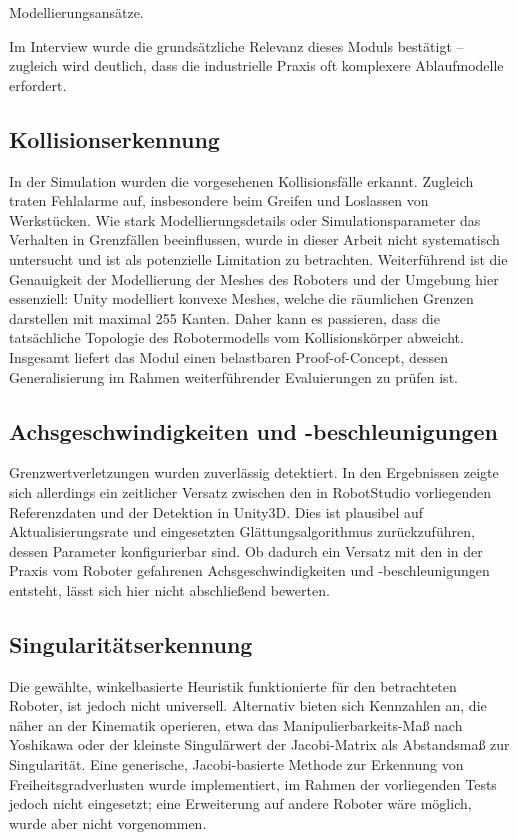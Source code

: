 Modellierungsansätze.{ Im Interview
  wurde die grundsätzliche Relevanz dieses
  Moduls bestätigt – zugleich wird deutlich, dass die industrielle Praxis oft
  komplexere Ablaufmodelle erfordert.

  \subsection{Kollisionserkennung}

  In der Simulation wurden die vorgesehenen Kollisionsfälle erkannt. Zugleich
  traten Fehlalarme auf, insbesondere beim Greifen und Loslassen von
  Werkstücken. Wie stark Modellierungsdetails oder
  Simulationsparameter das Verhalten in Grenzfällen beeinflussen,
  wurde in dieser Arbeit nicht systematisch untersucht
  und ist als potenzielle Limitation zu betrachten. Weiterführend ist die
  Genauigkeit der Modellierung der Meshes des Roboters und der Umgebung hier
  essenziell: Unity modelliert konvexe Meshes, welche die räumlichen Grenzen
  darstellen mit maximal 255 Kanten. Daher kann es passieren, dass die
  tatsächliche Topologie des Robotermodells vom Kollisionskörper abweicht.
  Insgesamt liefert das Modul einen belastbaren Proof-of-Concept, dessen
  Generalisierung im Rahmen weiterführender Evaluierungen zu prüfen ist.

  \subsection{Achsgeschwindigkeiten und -beschleunigungen}

  Grenzwertverletzungen wurden zuverlässig detektiert. In den Ergebnissen zeigte
  sich allerdings ein zeitlicher Versatz zwischen den in RobotStudio
  vorliegenden
  Referenzdaten und der Detektion in Unity3D. Dies ist plausibel auf
  Aktualisierungsrate und eingesetzten Glättungsalgorithmus
  zurückzuführen, dessen
  Parameter konfigurierbar sind. Ob dadurch ein Versatz mit den in der Praxis
  vom Roboter gefahrenen Achsgeschwindigkeiten und -beschleunigungen
  entsteht, lässt sich hier
  nicht abschließend bewerten.

  \subsection{Singularitätserkennung}

  Die gewählte, winkelbasierte Heuristik funktionierte für den betrachteten
  Roboter, ist jedoch nicht universell. Alternativ bieten sich
  Kennzahlen an, die
  näher an der Kinematik operieren, etwa das Manipulierbarkeits-Maß
  nach Yoshikawa oder
  der kleinste Singulärwert der Jacobi-Matrix als Abstandsmaß zur Singularität.
  Eine generische, Jacobi-basierte Methode zur Erkennung von
  Freiheitsgradverlusten wurde implementiert, im Rahmen der vorliegenden Tests
  jedoch nicht eingesetzt; eine Erweiterung auf andere Roboter wäre
  möglich, wurde
  aber nicht vorgenommen.

}
